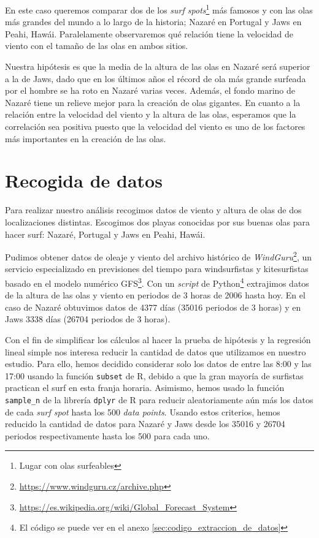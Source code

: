 En este caso queremos comparar dos de los \textit{surf spots}\footnote{Lugar con olas surfeables} más famosos y con las olas más grandes del mundo a lo largo de la historia; Nazaré en Portugal y Jaws en Peahi, Hawái. Paralelamente observaremos qué relación tiene la velocidad de viento con el tamaño de las olas en ambos sitios.

Nuestra hipótesis es que la media de la altura de las olas en Nazaré será superior a la de Jaws, dado que en los últimos años el récord de ola más grande surfeada por el hombre se ha roto en Nazaré varias veces. Además, el fondo marino de Nazaré tiene un relieve mejor para la creación de olas gigantes. En cuanto a la relación entre la velocidad del viento y la altura de las olas, esperamos que la correlación sea positiva
puesto que la velocidad del viento es uno de los factores más importantes en la creación de las olas.

\section{Recogida de datos}%
\label{sec:recogida_de_datos}
Para realizar nuestro análisis recogimos datos de viento y altura de olas de
dos localizaciones distintas. Escogimos dos playas conocidas por sus buenas
olas para hacer surf: Nazaré, Portugal y Jaws en Peahi, Hawái.

Pudimos obtener datos de oleaje y viento del archivo histórico de \emph{WindGuru}\footnote{\url{https://www.windguru.cz/archive.php}}, un servicio especializado en previsiones del tiempo para windsurfistas y kitesurfistas basado en el modelo numérico GFS\footnote{\url{https://es.wikipedia.org/wiki/Global_Forecast_System}}. Con un \textit{script} de
Python\footnote{El código se puede ver en el anexo
  \ref{sec:codigo_extraccion_de_datos}} extrajimos datos de la altura de las
olas y viento en periodos de 3 horas de 2006 hasta hoy. En el caso de Nazaré
obtuvimos datos de 4377 días (35016 periodos de 3 horas) y en Jaws 3338 días
(26704 periodos de 3 horas).

Con el fin de simplificar los cálculos al hacer la prueba de hipótesis y la regresión lineal simple nos interesa reducir la cantidad de datos que utilizamos en nuestro estudio. Para ello, hemos decidido considerar solo los datos de entre las 8:00 y las 17:00 usando la función \texttt{subset} de R, debido a que la gran mayoría de surfistas practican el surf en esta franja horaria. Asimismo, hemos usado la función \texttt{sample\_n} de la librería \texttt{dplyr} de R para reducir aleatoriamente aún más los datos de cada \textit{surf spot} hasta los 500 \textit{data points}. Usando estos criterios, hemos reducido la cantidad de datos para Nazaré y Jaws desde los 35016 y 26704 periodos respectivamente hasta los 500 para cada uno.

